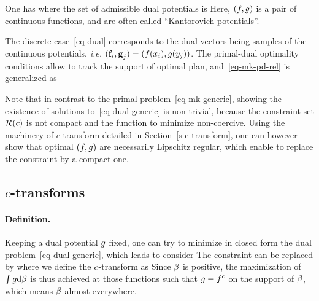 	
\begin{prop}
	One has
	where the set of admissible dual potentials is
	Here, $(f,g)$ is a pair of continuous functions, and are often called ``Kantorovich potentials''.
\end{prop}

The discrete case~\eqref{eq-dual} corresponds to the dual vectors being samples of the continuous potentials, \emph{i.e.} $(\mathrm{\textbf{\upshape f}}_i,\mathrm{\textbf{\upshape g}}_j)=(f(x_i),g(y_j))$. 
	The primal-dual optimality conditions allow to track the support of optimal plan, and~\eqref{eq-mk-pd-rel} is generalized as 
	
	Note that in contrast to the primal problem~\eqref{eq-mk-generic}, showing the existence of solutions to~\eqref{eq-dual-generic} is non-trivial, because the constraint set $\mathcal{R}(c)$ is not compact and the function to minimize non-coercive.
	Using the machinery of $c$-transform detailed in Section~\ref{s-c-transform}, one can however show that optimal $(f,g)$ are necessarily Lipschitz regular, which enable to replace the constraint by a compact one. 



\subsection{$c$-transforms}
\label{sec-c-transfo}

\paragraph{Definition.}

Keeping a dual potential $g$ fixed, one can try to minimize in closed form the dual problem~\eqref{eq-dual-generic}, which leads to consider
The constraint can be replaced by
where we define the $c$-transform as 
Since $\beta$ is positive, the maximization of $\int g \mathrm{d} \beta$ is thus achieved at those functions such that $g=f^c$ on the support of $\beta$, which means $\beta$-almost everywhere.

